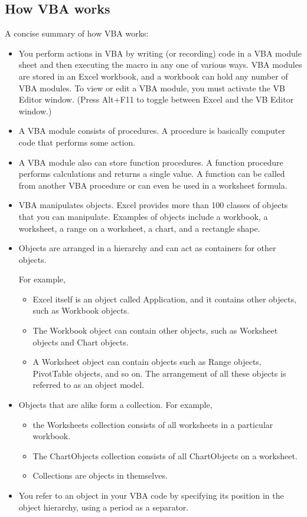 \documentclass[
]{article}
\theoremstyle{definition}
\theoremstyle{definition}
\theoremstyle{definition}
\theoremstyle{definition}
\theoremstyle{remark}
\begin{document}
\hypertarget{how-vba-works}{%
\subsection{How VBA works}\label{how-vba-works}}

A concise summary of how VBA works:

\begin{itemize}
\item
  You perform actions in VBA by writing (or recording) code in a VBA
  module sheet and then executing the macro in any one of various
  ways. VBA modules are stored in an Excel workbook, and a workbook
  can hold any number of VBA modules. To view or edit a VBA module,
  you must activate the VB Editor window. (Press Alt+F11 to toggle
  between Excel and the VB Editor window.)
\item
  A VBA module consists of procedures. A procedure is basically
  computer code that performs some action.
\item
  A VBA module also can store function procedures. A function
  procedure performs calculations and returns a single value. A
  function can be called from another VBA procedure or can even be
  used in a worksheet formula.
\item
  VBA manipulates objects. Excel provides more than 100 classes of
  objects that you can manipulate. Examples of objects include a
  workbook, a worksheet, a range on a worksheet, a chart, and a
  rectangle shape.
\item
  Objects are arranged in a hierarchy and can act as containers for
  other objects.

  For example,

  \begin{itemize}
  \item
    Excel itself is an object called Application, and it contains
    other objects, such as Workbook objects.
  \item
    The Workbook object can contain other objects, such as Worksheet
    objects and Chart objects.
  \item
    A Worksheet object can contain objects such as Range objects,
    PivotTable objects, and so on. The arrangement of all these
    objects is referred to as an object model.
  \end{itemize}
\item
  Objects that are alike form a collection. For example,

  \begin{itemize}
  \item
    the Worksheets collection consists of all worksheets in a
    particular workbook.
  \item
    The ChartObjects collection consists of all ChartObjects on a
    worksheet.
  \item
    Collections are objects in themselves.
  \end{itemize}
\item
  You refer to an object in your VBA code by specifying its position
  in the object hierarchy, using a period as a separator.


\end{itemize}
\end{document}
